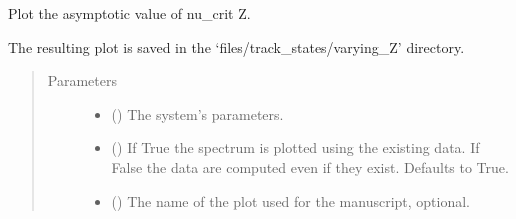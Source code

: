 \documentclass[letterpaper,10pt,english]{sphinxmanual}
\begin{document}
\begin{fulllineitems}
\label{\detokenize{modules:modules.utils.plot_nu_crit_limit_vs_Z}}
\pysigstartsignatures
{}
\pysigstopsignatures
\sphinxAtStartPar
Plot the asymptotic value of nu\_crit  Z.

\sphinxAtStartPar
The resulting plot is saved in the ‘files/track\_states/varying\_Z’ directory.
\begin{quote}\begin{description}
\item[{Parameters}] \leavevmode\begin{itemize}
\item {} 
\sphinxAtStartPar
{} () \textendash{} The system’s parameters.

\item {} 
\sphinxAtStartPar
{} () \textendash{} If True the spectrum is plotted using the existing data.
If False the data are computed even if they exist. Defaults to True.

\item {} 
\sphinxAtStartPar
{} () \textendash{} The name of the plot used for the manuscript, optional.

\end{itemize}

\end{description}\end{quote}

\end{fulllineitems}

\end{document}
